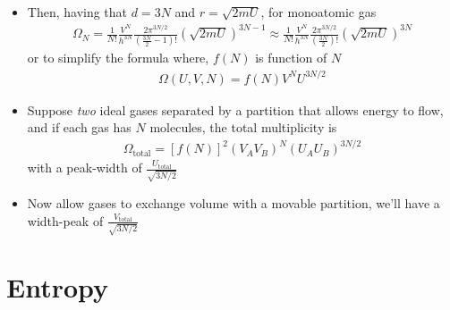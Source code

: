 \documentclass{book}
\begin{document}
\begin{itemize}
	\item Then, having that $d=3N$ and $r=\sqrt{2mU}$, for monoatomic gas
	      \begin{align}
		      \Omega_N = \frac{1}{N!} \frac{V^N}{h^{3N}} \frac{2\pi^{3N/2}}{(\frac{3N}{2} - 1)!}
		      (\sqrt{2mU})^{3N-1} \approx
		      \frac{1}{N!} \frac{V^N}{h^{3N}} \frac{2\pi^{3N/2}}{(\frac{3N}{2})!}
		      (\sqrt{2mU})^{3N}
	      \end{align}
	      or to simplify the formula where,  $f(N)$ is function of $N$
	      \begin{align}
		      \Omega (U, V, N) = f(N) V^N U^{3N/2}
	      \end{align}
	\item Suppose \textit{two} ideal gases separated by a partition that allows
	      energy to flow, and if each gas has $N$ molecules, the total multiplicity is
	      \begin{align}
		      \Omega_{\text{total}} = [f(N)]^2 (V_A V_B)^N (U_A U_B)^{3N/2}
	      \end{align}
	      with a peak-width of $\frac{U_{\text{total}}}{\sqrt{3N/2}}$
	\item Now allow gases to exchange volume with a movable partition, we'll have
	      a width-peak of $\frac{V_{\text{total}}}{\sqrt{3N/2}}$

\end{itemize}

\section{Entropy}%
\label{sec:entropy}
\end{document}
